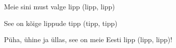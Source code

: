 Meie sini must valge lipp (lipp, lipp)

See on k\~oige lippude tipp (tipp, tipp)

P\"uha, \"uhine ja \"ullas, see on meie Eesti lipp (lipp, lipp)!
